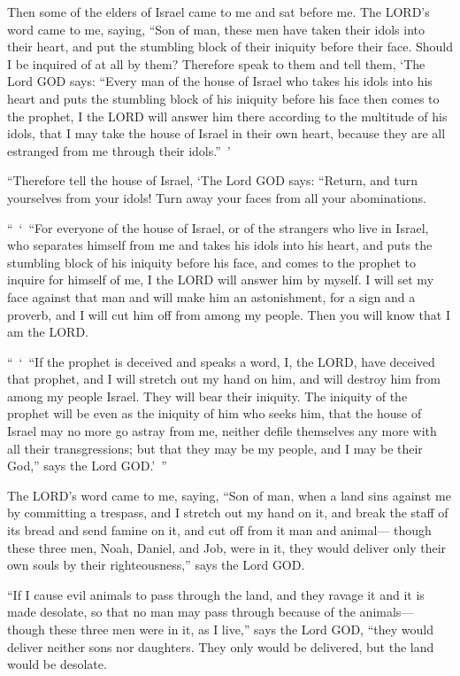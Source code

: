 \mychapter{} \myverse*{}Then some of the elders of Israel came to me and sat before me.
\myverse{}The LORD’s word came to me, saying,
\myverse{}“Son of man, these men have taken their idols into their heart, and put the
stumbling block of their iniquity before their face. Should I be inquired of at all by them?
\myverse{}Therefore speak to them and tell them, ‘The Lord GOD says: “Every man of the
house of Israel who takes his idols into his heart and puts the stumbling block of his iniquity before
his face then comes to the prophet, I the LORD will answer him there according to the multitude of his
idols,
\myverse{}that I may take the house of Israel in their own heart, because they are all
estranged from me through their idols.” ’

\myverse{}“Therefore tell the house of Israel, ‘The Lord GOD says: “Return,
and turn yourselves from your idols! Turn away your faces from all your abominations.

\myverse{}“ ‘ “For everyone of the house of Israel, or of the strangers who
live in Israel, who separates himself from me and takes his idols into his heart, and puts the stumbling
block of his iniquity before his face, and comes to the prophet to inquire for himself of me, I the LORD
will answer him by myself.
\myverse{}I will set my face against that man and will make him an astonishment, for
a sign and a proverb, and I will cut him off from among my people. Then you will know that I am the LORD.

\myverse{}“ ‘ “If the prophet is deceived and speaks a word, I, the LORD,
have deceived that prophet, and I will stretch out my hand on him, and will destroy him from among my
people Israel.
\myverse{}They will bear their iniquity. The iniquity of the prophet will be even as
the iniquity of him who seeks him,
\myverse{}that the house of Israel may no more go astray from me, neither defile themselves
any more with all their transgressions; but that they may be my people, and I may be their God,” says
the Lord GOD.’ ”

\myverse{}The LORD’s word came to me, saying,
\myverse{}“Son of man, when a land sins against me by committing a trespass, and I
stretch out my hand on it, and break the staff of its bread and send famine on it, and cut off from it
man and animal—
\myverse{}though these three men, Noah, Daniel, and Job, were in it, they would deliver
only their own souls by their righteousness,” says the Lord GOD.

\myverse{}“If I cause evil animals to pass through the land, and they
ravage it and it is made desolate, so that no man may pass through because of the animals—
\myverse{}though these three men were in it, as I live,” says the Lord GOD, “they would
deliver neither sons nor daughters. They only would be delivered, but the land would be desolate.

